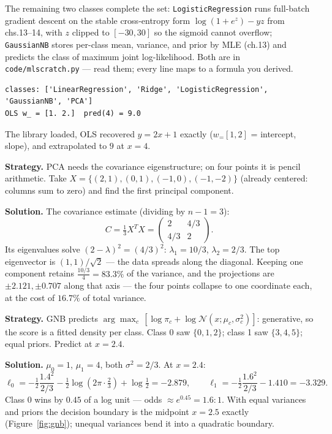 The remaining two classes complete the set:
\texttt{LogisticRegression} runs full-batch gradient descent on the
stable cross-entropy form $\log(1+e^z)-yz$ from chs.13--14, with $z$
clipped to $[-30,30]$ so the sigmoid cannot overflow;
\texttt{GaussianNB} stores per-class mean, variance, and prior by
MLE (ch.13) and predicts the class of maximum joint
log-likelihood. Both are in \texttt{code/mlscratch.py} --- read them;
every line maps to a formula you derived.

\begin{lstlisting}[caption={\ttfamily smoke test --- importing the
library and fitting OLS}]
classes: ['LinearRegression', 'Ridge', 'LogisticRegression', 'GaussianNB', 'PCA']
OLS w_ = [1. 2.]  pred(4) = 9.0
\end{lstlisting}

The library loaded, OLS recovered $y=2x+1$ exactly ($w_=[1,2]$ =
intercept, slope), and extrapolated to $9$ at $x=4$.

\begin{example}\label{ex:pcahand}
\textbf{Strategy.} PCA needs the covariance eigenstructure; on four
points it is pencil arithmetic. Take
$X=\{(2,1),(0,1),(-1,0),(-1,-2)\}$ (already centered: columns sum to
zero) and find the first principal component.

\textbf{Solution.} The covariance estimate (dividing by $n{-}1=3$):
\[
C=\tfrac13X^TX=\begin{pmatrix}2&4/3\\[2pt]4/3&2\end{pmatrix}.
\]
Its eigenvalues solve $(2-\lambda)^2=(4/3)^2$: $\lambda_1=10/3$,
$\lambda_2=2/3$. The top eigenvector is $(1,1)/\sqrt2$ --- the data
spreads along the diagonal. Keeping one component retains
$\frac{10/3}{4}=83.3\%$ of the variance, and the projections are
$\pm2.121,\pm0.707$ along that axis --- the four points collapse to
one coordinate each, at the cost of $16.7\%$ of total variance.
\end{example}

\begin{example}\label{ex:gnbhand}
\textbf{Strategy.} GNB predicts $\arg\max_c\,[\log\pi_c +
\log\mathcal N(x;\mu_c,\sigma_c^2)]$: generative, so the score is a
fitted density per class. Class 0 saw $\{0,1,2\}$; class 1 saw
$\{3,4,5\}$; equal priors. Predict at $x=2.4$.

\textbf{Solution.} $\mu_0=1$, $\mu_1=4$, both $\sigma^2=2/3$. At
$x=2.4$:
\[
\ell_0=-\tfrac12\frac{1.4^2}{2/3}-\tfrac12\log(2\pi\cdot\tfrac23)
+\log\tfrac12=-2.879,\qquad
\ell_1=-\tfrac12\frac{1.6^2}{2/3}-1.410=-3.329.
\]
Class 0 wins by $0.45$ of a log unit --- odds $\approx e^{0.45}=1.6:1$.
With equal variances and priors the decision boundary is the
midpoint $x=2.5$ exactly (Figure~\ref{fig:gnb}); unequal variances
bend it into a quadratic boundary.
\end{example}

